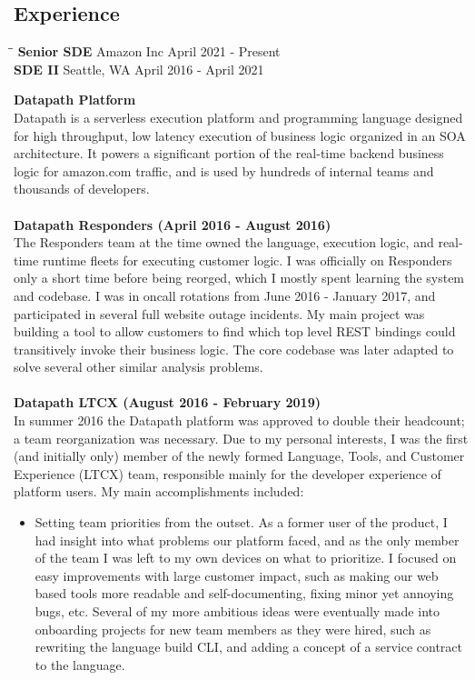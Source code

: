 \documentclass{res}
\begin{document}
\begin{resume}
\section{Experience}
   \vspace{-0.1in}
   \begin{tabbing}%
   \hspace{2.2in}\= \hspace{2.2in}\= \kill %
   {\bf Senior SDE}  \> Amazon Inc\> April 2021 - Present\\
   {\bf SDE II}          \> Seattle, WA \> April 2016 - April 2021
   \end{tabbing}\vspace{-17pt}
   {\large \bf Datapath Platform }\\
   Datapath is a serverless execution platform and programming language designed for high throughput, low latency execution of business logic organized in an SOA architecture.  It powers a significant portion of the real-time backend business logic for amazon.com traffic, and is used by hundreds of internal teams and thousands of developers.\\
   \\
   {\bf Datapath Responders (April 2016 - August 2016) }\\
   The Responders team at the time owned the language, execution logic, and real-time runtime fleets for executing customer logic.  I was officially on Responders only a short time before being reorged, which I mostly spent learning the system and codebase.  I was in oncall rotations from June 2016 - January 2017, and participated in several full website outage incidents.  My main project was building a tool to allow customers to find which top level REST bindings could transitively invoke their business logic.  The core codebase was later adapted to solve several other similar analysis problems.\\
   \\
   {\bf Datapath LTCX (August 2016 - February 2019) }\\
   In summer 2016 the Datapath platform was approved to double their headcount; a team reorganization was necessary.  Due to my personal interests, I was the first (and initially only) member of the newly formed Language, Tools, and Customer Experience (LTCX) team, responsible mainly for the developer experience of platform users.  My main accomplishments included:
   \begin{itemize}
   \item Setting team priorities from the outset.  As a former user of the product, I had insight into what problems our platform faced, and as the only member of the team I was left to my own devices on what to prioritize.  I focused on easy improvements with large customer impact, such as making our web based tools more readable and self-documenting, fixing minor yet annoying bugs, etc.  Several of my more ambitious ideas were eventually made into onboarding projects for new team members as they were hired, such as rewriting the language build CLI, and adding a concept of a service contract to the language.

\end{itemize}
\end{resume}
\end{document}
